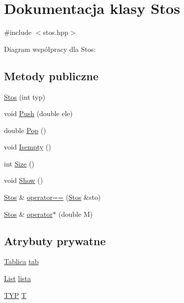 \hypertarget{class_stos}{\section{Dokumentacja klasy Stos}
\label{class_stos}
}


{\ttfamily \#include $<$stos.\-hpp$>$}



Diagram współpracy dla Stos\-:
\subsection*{Metody publiczne}
\begin{DoxyCompactItemize}
\item 
\hyperlink{class_stos_a9f1a0e5eb781e7296493d9c61f6ce2e2}{Stos} (int typ)
\item 
void \hyperlink{class_stos_af8c0c485dceb28e986cdc93e933ec365}{Push} (double ele)
\item 
double \hyperlink{class_stos_a620d6e49f74becaed97de2a911ef051c}{Pop} ()
\item 
void \hyperlink{class_stos_a8e559abb36abb64c458bdc281e273cba}{Isempty} ()
\item 
int \hyperlink{class_stos_a9861291fa460528db0dea0262bf88f69}{Size} ()
\item 
void \hyperlink{class_stos_abfb03d80298013a2792bde2fd89c3863}{Show} ()
\item 
\hyperlink{class_stos}{Stos} \& \hyperlink{class_stos_a46c03bf71cc3b8abc5537a5a408c43e8}{operator==} (\hyperlink{class_stos}{Stos} \&sto)
\item 
\hyperlink{class_stos}{Stos} \& \hyperlink{class_stos_a1a82883d837c3c63c3621e284c707304}{operator$\ast$} (double M)
\end{DoxyCompactItemize}
\subsection*{Atrybuty prywatne}
\begin{DoxyCompactItemize}
\item 
\hyperlink{class_tablica}{Tablica} \hyperlink{class_stos_a0cdca9595d13e2563eb3e0230ecf7619}{tab}
\item 
\hyperlink{class_list}{List} \hyperlink{class_stos_aad8157be87d5c0266b951b7e2bae7e5d}{lista}
\item 
\hyperlink{stos_8hpp_ad7b974b79929c04ea204e3304ff8c776}{T\-Y\-P} \hyperlink{class_stos_a62fd3591c5613480c3c770d90f7b91b1}{T}
\end{DoxyCompactItemize}


